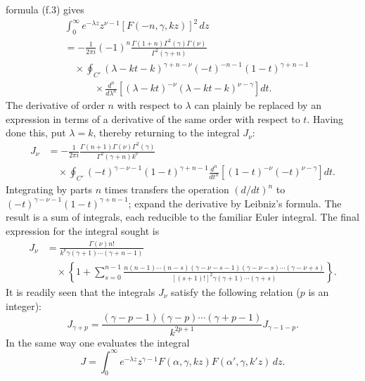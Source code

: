 formula (f.3) gives
\[
 \begin{split}
 &\int_0^\infty e^{-\lambda z}z^{\nu-1}[F(-n,\gamma,kz)]^2\,dz\\
 &=-\frac1{2\pi i}(-1)^n
 \frac{\Gamma(1+n)\Gamma^2(\gamma)\Gamma(\nu)}
 {\Gamma^2(\gamma+n)}\\
 &\hspace{1em}\times\oint_{C'}(\lambda-kt-k)^{\gamma+n-\nu}
 (-t)^{-n-1}(1-t)^{\gamma+n-1}\\
 &\hspace{3em}\times\frac{d^n}{d\lambda^n}
 \left[(\lambda-kt)^{-\nu}(\lambda-kt-k)^{\nu-\gamma}\right]dt.
 \end{split}
\]
The derivative of order $n$ with respect to $\lambda$ can plainly be
replaced by an expression in terms of a derivative of the same order with
respect to $t$. Having done this, put $\lambda=k$, thereby returning to the
integral $J_\nu$:
\[
 \begin{split}
 J_\nu&=-\frac1{2\pi i}
 \frac{\Gamma(n+1)\Gamma(\nu)\Gamma^2(\gamma)}
 {\Gamma^2(\gamma+n)k^\nu}\\
 &\hspace{1em}\times\oint_{C'}(-t)^{\gamma-\nu-1}(1-t)^{\gamma+n-1}
 \frac{d^n}{dt^n}\left[(1-t)^{-\nu}(-t)^{\nu-\gamma}\right]dt.
 \end{split}
\]
Integrating by parts $n$ times transfers the operation $(d/dt)^n$ to
$(-t)^{\gamma-\nu-1}(1-t)^{\gamma+n-1}$; expand the derivative by Leibniz's
formula. The result is a sum of integrals, each reducible to the familiar
Euler integral. The final expression for the integral sought is
\begin{equation}
 \begin{split}
 J_\nu&=\frac{\Gamma(\nu)n!}
 {k^\nu\gamma(\gamma+1)\cdots(\gamma+n-1)}\\
&\hspace{1em}\times\left\{1+\sum_{s=0}^{n-1}
 \frac{n(n-1)\cdots(n-s)(\gamma-\nu-s-1)
 (\gamma-\nu-s)\cdots(\gamma-\nu+s)}
 {[(s+1)!]^2\gamma(\gamma+1)\cdots(\gamma+s)}\right\}.
 \end{split}
 \tag{f.7}
\end{equation}
It is readily seen that the integrals $J_\nu$ satisfy the following relation
($p$ is an integer):
\begin{equation}
 J_{\gamma+p}=\frac{(\gamma-p-1)(\gamma-p)\cdots(\gamma+p-1)}
 {k^{2p+1}}J_{\gamma-1-p}.
 \tag{f.8}
\end{equation}
In the same way one evaluates the integral
\begin{equation}
 J=\int_0^\infty e^{-\lambda z}z^{\gamma-1}
 F(\alpha,\gamma,kz)F(\alpha',\gamma,k'z)\,dz.
 \tag{f.9}
\end{equation}


